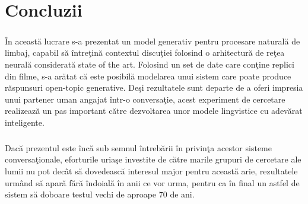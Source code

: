 \chapter{Concluzii}

\paragraph{}
\^ In aceast\u a lucrare s-a prezentat un model generativ pentru procesare natural\u a de limbaj, capabil s\u a \^ intre\c tin\u a contextul discu\c tiei folosind o arhitectur\u a de re\c tea neural\u a considerat\u a state of the art. Folosind un set de date care con\c tine replici din filme, s-a ar\u atat c\u a este posibil\u a modelarea unui sistem care poate produce r\u aspunsuri open-topic generative. De\c si rezultatele sunt departe de a oferi impresia unui partener uman angajat \^ intr-o conversa\c tie, acest experiment de cercetare realizeaz\u a un pas important c\u atre dezvoltarea unor modele lingvistice cu adev\u arat inteligente. 

\paragraph{}
Dac\u a prezentul este \^ inc\u a sub semnul \^ intreb\u arii \^ in privin\c ta acestor sisteme conversa\c tionale, eforturile uria\c se investite de c\u atre marile grupuri de cercetare ale lumii nu pot dec\^ at s\u a dovedeasc\u a interesul major pentru aceast\u a arie, rezultatele urm\^ and s\u a apar\u a f\u ar\u a \^ indoial\u a \^ in anii ce vor urma, pentru ca \^ in final un astfel de sistem s\u a doboare testul vechi de aproape 70 de ani.